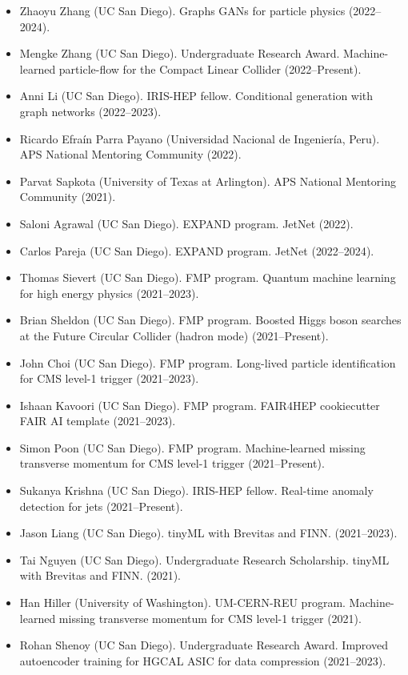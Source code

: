 \documentclass[11pt]{res}
\begin{document}
\begin{resume}
\begin{itemize}
    \item Zhaoyu Zhang (UC San Diego). Graphs GANs for particle physics ({2022--2024}).
    \item Mengke Zhang (UC San Diego). Undergraduate Research Award. Machine-learned particle-flow for the Compact Linear Collider ({2022--Present}).
    \item Anni Li (UC San Diego). IRIS-HEP fellow. Conditional generation with graph networks ({2022--2023}).
    \item Ricardo Efra\'{i}n Parra Payano (Universidad Nacional de Ingenier\'{i}a, Peru). APS National Mentoring Community ({2022}).
    \item Parvat Sapkota (University of Texas at Arlington). APS National Mentoring Community ({2021}).
    \item Saloni Agrawal (UC San Diego). EXPAND program. JetNet ({2022}).
    \item Carlos Pareja (UC San Diego). EXPAND program. JetNet ({2022--2024}).
    \item Thomas Sievert (UC San Diego). FMP program. Quantum machine learning for high energy physics ({2021--2023}).
    \item Brian Sheldon (UC San Diego). FMP program. Boosted Higgs boson searches at the Future Circular Collider (hadron mode) ({2021--Present}).
    \item John Choi (UC San Diego). FMP program. Long-lived particle identification for CMS level-1 trigger ({2021--2023}).
    \item Ishaan Kavoori (UC San Diego). FMP program. FAIR4HEP cookiecutter FAIR AI template ({2021--2023}).
    \item Simon Poon (UC San Diego). FMP program. Machine-learned missing transverse momentum for CMS level-1 trigger ({2021--Present}).
    \item Sukanya Krishna (UC San Diego). IRIS-HEP fellow. Real-time anomaly detection for jets ({2021--Present}).
    \item Jason Liang (UC San Diego). tinyML with Brevitas and FINN. ({2021--2023}).
    \item Tai Nguyen (UC San Diego). Undergraduate Research Scholarship. tinyML with Brevitas and FINN. ({2021}).
    \item Han Hiller (University of Washington). UM-CERN-REU program. Machine-learned missing transverse momentum for CMS level-1 trigger ({2021}).
    \item Rohan Shenoy (UC San Diego). Undergraduate Research Award. Improved autoencoder training for HGCAL ASIC for data compression ({2021--2023}).

\end{itemize}
\end{resume}
\end{document}
